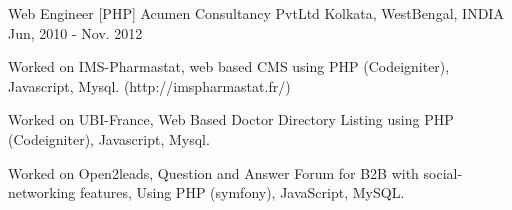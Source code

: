 \begin{cventries}
  \cventry
    {Web Engineer  [PHP]} %
    {Acumen Consultancy PvtLtd} %
    {Kolkata, WestBengal,  INDIA} %
    {Jun, 2010 - Nov. 2012} %
    {
      \begin{cvitems} %
        \item {Worked on IMS-Pharmastat, web based CMS using PHP (Codeigniter), Javascript, Mysql. (http://imspharmastat.fr/)}
        \item {Worked on UBI-France, Web Based Doctor Directory Listing using PHP (Codeigniter), Javascript, Mysql.}
        \item {Worked on Open2leads, Question and Answer Forum for B2B with social-networking features, Using  PHP (symfony), JavaScript, MySQL.}
      \end{cvitems}
    }
\end{cventries}
